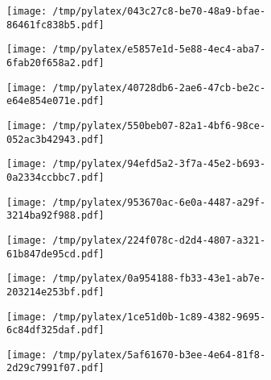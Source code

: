 \documentclass{article}
\begin{document}
\begin{figure}[htbp]
\begin{subfigure}[b]{.3\linewidth}
\texttt{[image: /tmp/pylatex/043c27c8-be70-48a9-bfae-86461fc838b5.pdf]}
\end{subfigure}
\begin{subfigure}[b]{.3\linewidth}
\texttt{[image: /tmp/pylatex/e5857e1d-5e88-4ec4-aba7-6fab20f658a2.pdf]}
\end{subfigure}
\begin{subfigure}[b]{.3\linewidth}
\texttt{[image: /tmp/pylatex/40728db6-2ae6-47cb-be2c-e64e854e071e.pdf]}
\end{subfigure}
\begin{subfigure}[b]{.3\linewidth}
\texttt{[image: /tmp/pylatex/550beb07-82a1-4bf6-98ce-052ac3b42943.pdf]}
\end{subfigure}
\begin{subfigure}[b]{.3\linewidth}
\texttt{[image: /tmp/pylatex/94efd5a2-3f7a-45e2-b693-0a2334ccbbc7.pdf]}
\end{subfigure}
\begin{subfigure}[b]{.3\linewidth}
\texttt{[image: /tmp/pylatex/953670ac-6e0a-4487-a29f-3214ba92f988.pdf]}
\end{subfigure}
\begin{subfigure}[b]{.3\linewidth}
\texttt{[image: /tmp/pylatex/224f078c-d2d4-4807-a321-61b847de95cd.pdf]}
\end{subfigure}
\begin{subfigure}[b]{.3\linewidth}
\texttt{[image: /tmp/pylatex/0a954188-fb33-43e1-ab7e-203214e253bf.pdf]}
\end{subfigure}
\begin{subfigure}[b]{.3\linewidth}
\texttt{[image: /tmp/pylatex/1ce51d0b-1c89-4382-9695-6c84df325daf.pdf]}
\end{subfigure}
\begin{subfigure}[b]{.3\linewidth}
\texttt{[image: /tmp/pylatex/5af61670-b3ee-4e64-81f8-2d29c7991f07.pdf]}
\end{subfigure}
\end{figure}
\end{document}
